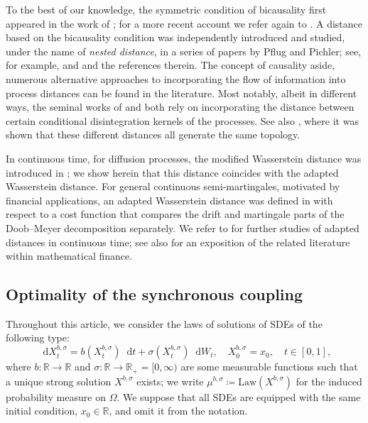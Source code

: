 \documentclass[oneside]{amsart}
\theoremstyle{definition}
\newcommand{\Law}{\mathrm{Law}}
\newcommand{\R}{\mathbb R}
\newcommand{\dt}{\mathop{}\!\mathrm{d}t}
\newcommand{\di}{\mathop{}\!\mathrm{d}}
\def\R{{\mathbb R}}
\numberwithin{equation}{section}
\begin{document}
	To the best of our knowledge, the symmetric condition of bicausality first appeared in the work of \citet{Ru85}; for a more recent account we refer again to \cite{BaBeLiZa17}. A distance based on the bicausality condition was independently introduced and studied, under the name of \emph{nested distance}, in a series of papers by Pflug and Pichler; see, for example, \cite{PfPi12} and \cite{PfPi14} and the references therein. 
	The concept of causality aside, numerous alternative approaches to incorporating the flow of information into process distances can be found in the literature. Most notably, albeit in different ways, the seminal works of \citet{Al81} and \citet{He96} both rely on incorporating the distance between certain conditional disintegration kernels of the processes. See also \cite{BaBaBeEd19b}, where it was shown that these different distances all generate the same topology. 
	
	In continuous time, for diffusion processes, the modified Wasserstein distance was introduced in \cite{BiTa19}; we show herein that this distance coincides with the adapted Wasserstein distance.
	For general continuous semi-martingales, motivated by financial applications, an adapted Wasserstein distance was defined in \cite{BaBaBeEd19a} with respect to a cost function that compares the drift and martingale parts of the Doob--Meyer decomposition separately.
	We refer to \cite{AcBaCa18,AcBaZa20} for further studies of adapted distances in continuous time; see also \cite[Section~2]{BaBeLiZa17} for an exposition of the related literature within mathematical finance.

	
\subsection*{Optimality of the synchronous coupling}

	Throughout this article, we consider the laws of solutions of SDEs of the following type: 
\begin{equation}\label{eq:sde}
	\di X^{b,\sigma}_t=b(X^{b,\sigma}_t)\dt+\sigma(X^{b,\sigma}_t)\di W_t,
	\quad X^{b,\sigma}_0=x_0,
	\quad t \in [0, 1],
\end{equation}
where $b \colon \R\to\R$ and $\sigma \colon \R\to\R_+ = [0, \infty)$ are some measurable functions such that a unique strong solution $X^{b, \sigma}$ exists; we write $\mu^{b,\sigma} \coloneqq  \Law(X^{b, \sigma})$ for the induced probability measure on $\Omega$. We suppose that all SDEs are equipped with the same initial condition, $x_0\in\R$, and omit it from the notation.
	
\end{document}
